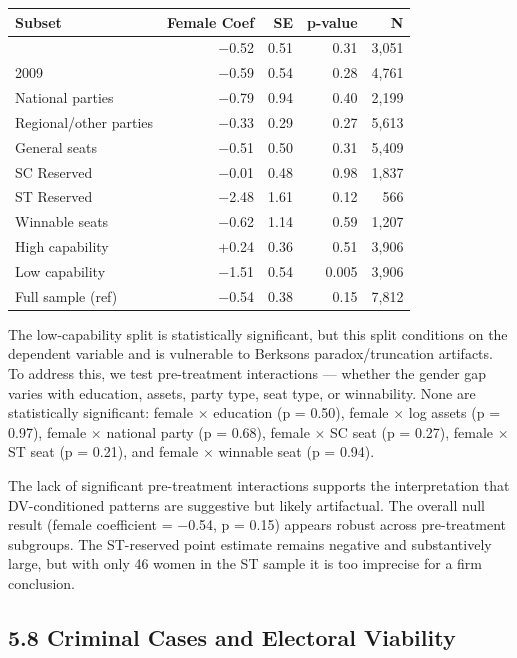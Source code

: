 \documentclass[
]{article}
\newcounter{none} %
\begin{document}
{\def\LTcaptype{none} %
\begin{longtable}[]{@{}lrrrr@{}}
\toprule\noalign{}
Subset & Female Coef & SE & p-value & N \\
\midrule\noalign{}
\endhead
\bottomrule\noalign{}
\endlastfoot
2004 & $-$0.52 & 0.51 & 0.31 & 3,051 \\
2009 & $-$0.59 & 0.54 & 0.28 & 4,761 \\
National parties & $-$0.79 & 0.94 & 0.40 & 2,199 \\
Regional/other parties & $-$0.33 & 0.29 & 0.27 & 5,613 \\
General seats & $-$0.51 & 0.50 & 0.31 & 5,409 \\
SC Reserved & $-$0.01 & 0.48 & 0.98 & 1,837 \\
ST Reserved & $-$2.48 & 1.61 & 0.12 & 566 \\
Winnable seats & $-$0.62 & 1.14 & 0.59 & 1,207 \\
High capability & +0.24 & 0.36 & 0.51 & 3,906 \\
Low capability & $-$1.51 & 0.54 & 0.005 & 3,906 \\
Full sample (ref) & $-$0.54 & 0.38 & 0.15 & 7,812 \\
\end{longtable}
}

The low-capability split is statistically significant, but this split conditions on the dependent variable and is vulnerable to Berkson\textquotesingle s paradox/truncation artifacts. To address this, we test pre-treatment interactions --- whether the gender gap varies with education, assets, party type, seat type, or winnability. None are statistically significant: female $\times$ education (p = 0.50), female $\times$ log assets (p = 0.97), female $\times$ national party (p = 0.68), female $\times$ SC seat (p = 0.27), female $\times$ ST seat (p = 0.21), and female $\times$ winnable seat (p = 0.94).

The lack of significant pre-treatment interactions supports the interpretation that DV-conditioned patterns are suggestive but likely artifactual. The overall null result (female coefficient = $-$0.54, p = 0.15) appears robust across pre-treatment subgroups. The ST-reserved point estimate remains negative and substantively large, but with only 46 women in the ST sample it is too imprecise for a firm conclusion.

\subsection{5.8 Criminal Cases and Electoral Viability}\label{58-criminal-cases-and-electoral-viability}
\end{document}
